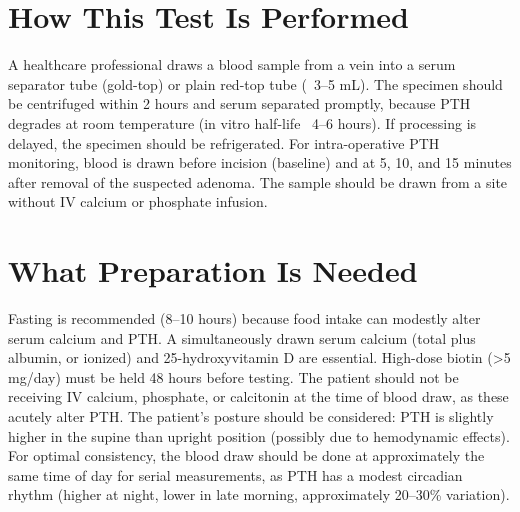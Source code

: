 \section*{How This Test Is Performed}
A healthcare professional draws a blood sample from a vein into a serum separator tube (gold-top) or plain red-top tube (~3--5 mL). The specimen should be centrifuged within 2 hours and serum separated promptly, because PTH degrades at room temperature (in vitro half-life ~4--6 hours). If processing is delayed, the specimen should be refrigerated. For intra-operative PTH monitoring, blood is drawn before incision (baseline) and at 5, 10, and 15 minutes after removal of the suspected adenoma. The sample should be drawn from a site without IV calcium or phosphate infusion.

\section*{What Preparation Is Needed}
Fasting is recommended (8--10 hours) because food intake can modestly alter serum calcium and PTH. A simultaneously drawn serum calcium (total plus albumin, or ionized) and 25-hydroxyvitamin D are essential. High-dose biotin (>5 mg/day) must be held 48 hours before testing. The patient should not be receiving IV calcium, phosphate, or calcitonin at the time of blood draw, as these acutely alter PTH. The patient's posture should be considered: PTH is slightly higher in the supine than upright position (possibly due to hemodynamic effects). For optimal consistency, the blood draw should be done at approximately the same time of day for serial measurements, as PTH has a modest circadian rhythm (higher at night, lower in late morning, approximately 20--30\% variation).

